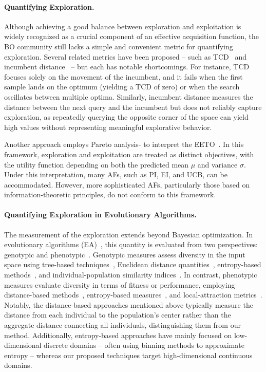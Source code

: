 \documentclass[accepted]{uai2025}
\begin{document}
\paragraph{Quantifying Exploration.}
Although achieving a good balance between exploration and exploitation is widely recognized as a crucial component of an effective acquisition function, the \ac{BO} community still lacks a simple and convenient metric for quantifying exploration. Several related metrics have been proposed -- such as \ac{TCD}~\citep[Fig.~6]{eriksson2019scalable} and incumbent distance~\citep[Fig.~20]{hvarfner2024vanilla} -- but each has notable shortcomings. For instance, \ac{TCD} focuses solely on the movement of the incumbent, and it fails when the first sample lands on the optimum (yielding a \ac{TCD} of zero) or when the search oscillates between multiple optima. Similarly, incumbent distance measures the distance between the next query and the incumbent but does not reliably capture exploration, as repeatedly querying the opposite corner of the space can yield high values without representing meaningful explorative behavior.

Another approach employs Pareto analysis- 
to interpret the \ac{EETO}~\citep{bischl2014moi,feng2015multiobjective,vzilinskas2019bi,de2021greed}. In this framework, exploration and exploitation are treated as distinct objectives, with the utility function depending on both the predicted mean $\mu$ and variance $\sigma$. Under this interpretation, many \acp{AF}, such as \ac{PI}, \ac{EI}, and \ac{UCB}, can be accommodated. However, more sophisticated \acp{AF}, particularly those based on information-theoretic principles, do not conform to this framework.

\paragraph{Quantifying Exploration in Evolutionary Algorithms.}
The measurement of the exploration extends beyond Bayesian optimization. In evolutionary algorithms (EA)~\citep{eiben2015introduction}, this quantity is evaluated from two perspectives: genotypic and phenotypic~\citep{vcrepinvsek2013exploration}. Genotypic measures assess diversity in the input space using tree-based techniques~\citep{burke2002advanced,vcrepinvsek2011analysis}, Euclidean distance quantities~\citep{mcginley2011maintaining}, entropy-based methods~\citep{misevivcius2011generation}, and individual-population similarity indices~\citep{inoue2015analyzing}. In contrast, phenotypic measures evaluate diversity in terms of fitness or performance, employing distance-based methods~\citep{chaiyaratana2007effects}, entropy-based measures~\citep{adra2010diversity, turkey2014model}, and local-attraction metrics~\citep{jerebic2021novel}. Notably, the distance-based approaches mentioned above typically measure the distance from each individual to the population's center rather than the aggregate distance connecting all individuals, distinguishing them from our method. Additionally, entropy-based approaches have mainly focused on low-dimensional discrete domains -- often using binning methods to approximate entropy -- whereas our proposed techniques target high-dimensional continuous domains.
\end{document}
